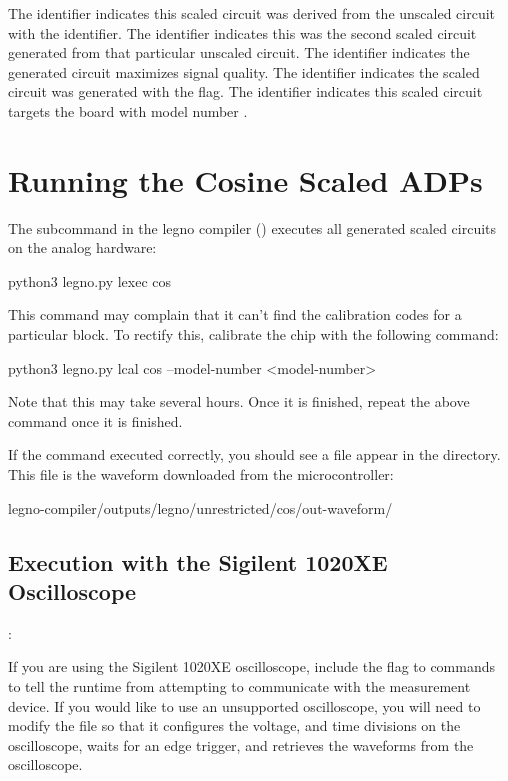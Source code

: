 The  identifier indicates this scaled circuit was derived from the
unscaled circuit with the  identifier. The  identifier indicates
this was the second scaled circuit generated from that particular unscaled
circuit. The  identifier indicates the generated circuit maximizes
signal quality. The  identifier indicates the scaled circuit was generated
with the  flag. The  identifier indicates this
scaled circuit targets the board with model number .


\section{Running the Cosine Scaled ADPs}

The  subcommand in the legno compiler () executes
all generated scaled circuits on the analog hardware:

\begin{snippet}
python3 legno.py lexec cos 
\end{snippet}

This command may complain that it can't find the calibration codes for a
particular block. To rectify this, calibrate the chip with the following
command:


\begin{snippet}
  python3 legno.py lcal cos --model-number <model-number>
\end{snippet}

Note that this may take several hours. Once it is finished, repeat the above
 command once it is finished.

If the  command executed correctly, you should see a  file appear in
the  directory. This file is the waveform downloaded from the
microcontroller:

\begin{snippet}
legno-compiler/outputs/legno/unrestricted/cos/out-waveform/
\end{snippet}

\subsection{Execution with the Sigilent 1020XE Oscilloscope}:

If you are using the Sigilent 1020XE oscilloscope, include the
 flag to  commands to tell the runtime
from attempting to communicate with the measurement device. If you would like to
use an unsupported oscilloscope, you will need to modify the 
file so that it configures the voltage, and time divisions on the oscilloscope, waits for
an edge trigger, and retrieves the waveforms from the oscilloscope.

